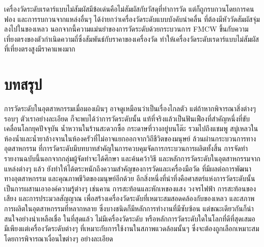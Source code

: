 \documentclass[final,11pt,a4paper]{article}
\begin{document}
เครื่องวัดระดับเรดาร์แบบไม่สัมผัสมีข้อเด่นคือไม่สัมผัสกับวัสดุที่ทำการวัด แต่ก็ถูกรบกวนโดยการคน 
ฟอง และการรบกวนจากแหล่งอื่นๆ ได้ง่ายกว่าเครื่องวัดระดับแบบบังคับนำคลื่น ที่ต้องมีหัววัดสัมผัสจุ่มลงไปในของเหลว นอกจากนี้ความแม่นยำของการวัดระดับด้วยกระบวนการ
FMCW ขึ้นกับความเที่ยงตรงของตัวกำเนิดความถี่ซึ่งสัมพันธ์กับราคาของเครื่องวัด ทำให้เครื่องวัดระดับเรดาร์แบบไม่สัมผัสที่เที่ยงตรงสูงมีราคาแพงมาก
\newpage
\section{บทสรุป}
การวัดระดับในอุตสาหกรรมเมื่อมองเผินๆ อาจดูเหมือนว่าเป็นเรื่องไกลตัว แต่ถ้าหากพิจารณาสิ่งต่างๆ รอบๆ ตัวเราอย่างละเอียด ก็จะพบได้ว่าการวัดระดับนั้น 
แท้ที่จริงแล้วเป็นฟันเฟืองที่สำคัญหนึ่งที่ขับเคลื่อนโลกยุคปัจจุบัน น้ำหวานในร้านสะดวกซื้อ กระดาษที่วางอยู่บนโต๊ะ
รวมไปถึงแชมพู สบู่เหลวในห้องน้ำและน้ำยาล้างจานในห้องครัวที่ไม่อาจแยกออกจากวิถีชีวิตของมนุษย์ ล้วนผ่านกระบวนการทางอุตสาหกรรม
ที่การวัดระดับมีบทบาทสำคัญในการควบคุมจัดการกระบวนการผลิตทั้งสิ้น การจัดทำรายงานฉบับนี้นอกจากกลุ่มผู้จัดทำจะได้ศึกษา 
และค้นคว้าวิธี และหลักการวัดระดับในอุตสาหกรรมจากแหล่งต่างๆ แล้ว ยังทำให้ได้ตระหนักถึงความสำคัญของการวัดและเครื่องมือวัด ที่มีผลต่อการพัฒนาทางอุตสาหกรรม
และคุณภาพชีวิตของมนุษย์อีกด้วย อีกสิ่งหนึ่งที่น่าทึ่งคือศาสตร์แห่งการวัดระดับนั้นเป็นการผสานเอาองค์ความรู้ต่างๆ เช่นคาน การสะท้อนและหักเหของแสง วงจรไฟฟ้า 
การสะท้อนของเสียง และการประมวลสัญญาณ เพื่อสร้างเครื่องวัดระดับที่เหมาะสมสอดคล้องกับของเหลว และสภาพการผลิตในอุตสาหกรรมที่หลากหลาย 
ซึ่งบางชนิดก็มีหลักการทำงานที่มีซับซ้อน แต่ขณะเดียวกันก็น่าสนใจอย่างน่าเหลือเชื่อ ในที่สุดแล้ว 
ไม่มีเครื่องวัดระดับ หรือหลักการวัดระดับใดในโลกที่ดีที่สุดเสมอ มีเพียงแต่เครื่องวัดระดับต่างๆ ที่เหมาะกับการใช้งานในสภาพแวดล้อมนั้นๆ 
ซึ่งจะต้องถูกเลือกเหมาะสมโดยการพิจารณาเงื่อนไขต่างๆ อย่างละเอียด
\newpage
\nocite{*}


\end{document}
